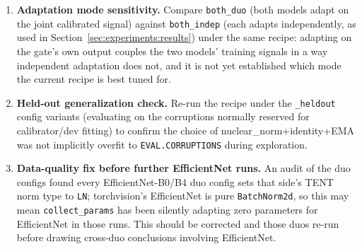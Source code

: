 \begin{enumerate}
    form) and \texttt{calibration\_mode=optimal\_w\_oracle}
    (best achievable $w_l$ with no functional-form constraint at all) -- now
    live-adapting, to quantify how much of the achievable gain the
    label-free recipe is actually capturing once adaptation feedback is in
    the loop, rather than relying on the frozen-setting headroom estimates.
    \item \textbf{Adaptation mode sensitivity.} Compare \texttt{both\_duo}
    (both models adapt on the joint calibrated signal) against
    \texttt{both\_indep} (each adapts independently, as used in
    Section~\ref{sec:experiments:results}) under the same recipe: adapting
    on the gate's own output couples the two models' training signals in a
    way independent adaptation does not, and it is not yet established
    which mode the current recipe is best tuned for.
    \item \textbf{Held-out generalization check.} Re-run the recipe under the
    \texttt{\_heldout} config variants (evaluating on the corruptions
    normally reserved for calibrator/dev fitting) to confirm the choice of
    nuclear\_norm+identity+EMA was not implicitly overfit to
    \texttt{EVAL.CORRUPTIONS} during exploration.
    \item \textbf{Data-quality fix before further EfficientNet runs.} An
    audit of the duo configs found every EfficientNet-B0/B4 duo config sets
    that side's TENT norm type to \texttt{LN}; torchvision's EfficientNet is
    pure \texttt{BatchNorm2d}, so this may mean \texttt{collect\_params} has
    been silently adapting zero parameters for EfficientNet in those runs.
    This should be corrected and those duos re-run before drawing
    cross-duo conclusions involving EfficientNet.
\end{enumerate}
